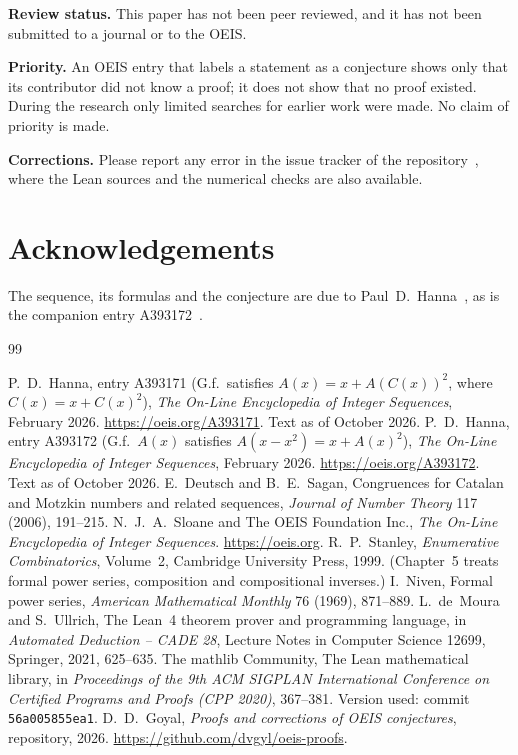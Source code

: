 \documentclass[11pt,a4paper]{article}
\theoremstyle{definition}
\theoremstyle{remark}
\newcommand{\para}[1]{\par\medskip\noindent\textbf{#1}\enspace}
\begin{document}
\para{Review status.} This paper has not been peer reviewed, and it has not been submitted to a journal or to the OEIS.

\para{Priority.} An OEIS entry that labels a statement as a conjecture shows only that its contributor did not know
a proof; it does not show that no proof existed. During the research only limited searches for earlier work were
made. No claim of priority is made.

\para{Corrections.} Please report any error in the issue tracker of the repository~\cite{repo}, where the Lean sources and the numerical checks are also
available.

\section*{Acknowledgements}
The sequence, its formulas and the conjecture are due to Paul~D.~Hanna~\cite{oeis}, as is the companion entry
A393172~\cite{oeis172}.

\begin{thebibliography}{99}\small
\raggedright
{} P.~D.~Hanna, entry A393171 (G.f.\ satisfies $A(x)=x+A(C(x))^2$, where $C(x)=x+C(x)^2$), \emph{The On-Line Encyclopedia of Integer Sequences}, February 2026. \url{https://oeis.org/A393171}. Text as of October 2026.
 P.~D.~Hanna, entry A393172 (G.f.\ $A(x)$ satisfies $A(x-x^2)=x+A(x)^2$), \emph{The On-Line Encyclopedia of Integer Sequences}, February 2026. \url{https://oeis.org/A393172}. Text as of October 2026.
 E.~Deutsch and B.~E.~Sagan, Congruences for Catalan and Motzkin numbers and related sequences, \emph{Journal of Number Theory} 117 (2006), 191--215.
 N.~J.~A.~Sloane and The OEIS Foundation Inc., \emph{The On-Line Encyclopedia of Integer Sequences}. \url{https://oeis.org}.
 R.~P.~Stanley, \emph{Enumerative Combinatorics}, Volume~2, Cambridge University Press, 1999. (Chapter~5 treats formal power series, composition and compositional inverses.)
 I.~Niven, Formal power series, \emph{American Mathematical Monthly} 76 (1969), 871--889.
 L.~de~Moura and S.~Ullrich, The Lean~4 theorem prover and programming language, in \emph{Automated Deduction -- CADE 28}, Lecture Notes in Computer Science 12699, Springer, 2021, 625--635.
 The mathlib Community, The Lean mathematical library, in \emph{Proceedings of the 9th ACM SIGPLAN International Conference on Certified Programs and Proofs (CPP 2020)}, 367--381. Version used: commit \texttt{56a005855ea1}.
 D.~D.~Goyal, \emph{Proofs and corrections of OEIS conjectures}, repository, 2026. \url{https://github.com/dvgyl/oeis-proofs}.
\end{thebibliography}
\end{document}
